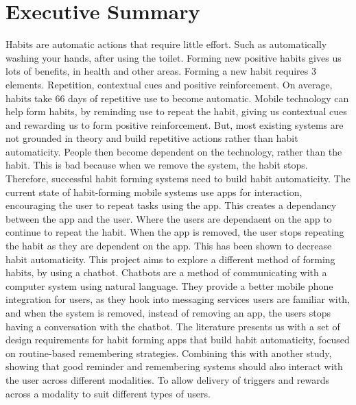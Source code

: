 \section{Executive Summary}

Habits are automatic actions that require little effort. Such as automatically washing your hands, after using the toilet. Forming new positive habits gives us lots of benefits, in health and other areas. Forming a new habit requires 3 elements. Repetition, contextual cues and positive reinforcement. On average, habits take 66 days of repetitive use to become automatic.\newline
\newline
Mobile technology can help form habits, by reminding use to repeat the habit, giving us contextual cues and rewarding us to form positive reinforcement. But, most existing systems are not grounded in theory and build repetitive actions rather than habit automaticity. People then become dependent on the technology, rather than the habit. This is bad because when we remove the system, the habit stops. Therefore, successful habit forming systems need to build habit automaticity.\newline
\newline
The current state of habit-forming mobile systems use apps for interaction, encouraging the user to repeat tasks using the app. This creates a dependancy between the app and the user. Where the users are dependaent on the app to continue to repeat the habit. When the app is removed, the user stops repeating the habit as they are dependent on the app. This has been shown to decrease habit automaticity.\newline
\newline
This project aims to explore a different method of forming habits, by using a chatbot.\newline
Chatbots are a method of communicating with a computer system using natural language. They provide a better mobile phone integration for users, as they hook into messaging services users are familiar with, and when the system is removed, instead of removing an app, the users stops having a conversation with the chatbot.\newline
\newline
The literature presents us with a set of design requirements for habit forming apps that build habit automaticity, focused on routine-based remembering strategies. Combining this with another study, showing that good reminder and remembering systems should also interact with the user across different modalities. To allow delivery of triggers and rewards across a modality to suit different types of users.\newline
